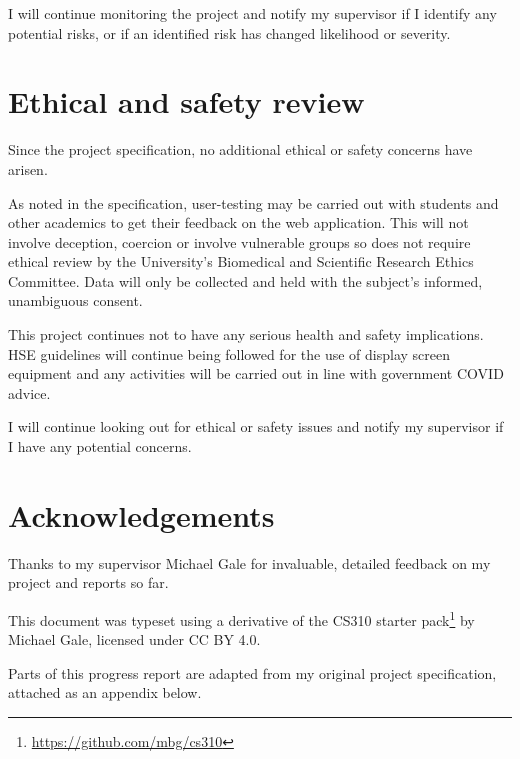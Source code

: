\documentclass[a4paper,fleqn,12pt]{article}
\begin{document}
I will continue monitoring the project and notify my supervisor if I identify any potential risks, or if an identified risk has changed likelihood or severity.

\section{Ethical and safety review}\label{id:h.yity1y53zkk0}

Since the project specification, no additional ethical or safety concerns have arisen.

As noted in the specification, user-testing may be carried out with students and other academics to get their feedback on the web application. This will not involve deception, coercion or involve vulnerable groups so does not require ethical review by the University’s Biomedical and Scientific Research Ethics Committee. Data will only be collected and held with the subject's informed, unambiguous consent.

This project continues not to have any serious health and safety implications. HSE guidelines will continue being followed for the use of display screen equipment and any activities will be carried out in line with government COVID advice.

I will continue looking out for ethical or safety issues and notify my supervisor if I have any potential concerns.

\section{Acknowledgements}\label{id:h.xqaef57orpsv}

Thanks to my supervisor Michael Gale for invaluable, detailed feedback on my project and reports so far.

This document was typeset using a derivative of the CS310 starter pack\footnote{\href{https://github.com/mbg/cs310}{https://github.com/mbg/cs310}} by Michael Gale, licensed under CC BY 4.0.

Parts of this progress report are adapted from my original project specification, attached as an appendix below.




\end{document}
